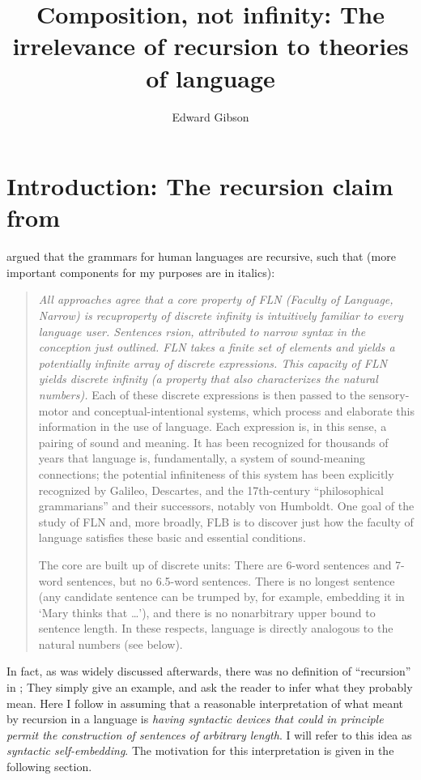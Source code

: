 \documentclass{article}
\title[Composition, not infinity]{Composition, not infinity: The irrelevance of recursion to theories of language}
\author{Edward Gibson\affiliation{Department of Brain and Cognitive Sciences, MIT}}
\begin{document}
\maketitle
\label{chap-2_gibson}


\section{Introduction: The recursion claim from \citet{hauser2002faculty}}

\citet{hauser2002faculty} argued that the grammars for human languages are recursive, such that (more important components for my purposes are in italics):

\begin{quote}
\textit{All approaches agree that a core property of FLN (Faculty of Language, Narrow) is recuproperty of discrete infinity is intuitively familiar to every language user. Sentences rsion, attributed to narrow syntax in the conception just outlined. FLN takes a finite set of elements and yields a potentially infinite array of discrete expressions. This capacity of FLN yields discrete infinity (a property that also characterizes the natural numbers).} Each of these discrete expressions is then passed to the sensory-motor and conceptual-intentional systems, which process and elaborate this information in the use of language. Each expression is, in this sense, a pairing of sound and meaning. It has been recognized for thousands of years that language is, fundamentally, a system of sound-meaning connections; the potential infiniteness of this system has been explicitly recognized by Galileo, Descartes, and the 17th-century ``philosophical grammarians'' and their successors, notably von Humboldt. One goal of the study of FLN and, more broadly, FLB is to discover just how the faculty of language satisfies these basic and essential conditions.

\textit{}{The core are built up of discrete units:  There are 6-word sentences and 7-word sentences, but no 6.5-word sentences.  There is no longest sentence (any candidate sentence can be trumped by, for example, embedding it in `Mary thinks that  \ldots '), and there is no nonarbitrary upper bound to sentence length.  In these respects, language is directly analogous to the natural numbers (see below). } \citep[1571]{hauser2002faculty}
\end{quote}

In fact, as was widely discussed afterwards, there was no definition of ``recursion'' in \citet{hauser2002faculty};  They simply give an example, and ask the reader to infer what they probably mean.  
Here I follow \citet{pullum2020theorizing}  in assuming that a reasonable interpretation of what  \citet{hauser2002faculty} meant by recursion in a language is \textit{having syntactic devices that could in principle permit the construction of sentences of arbitrary length}.  I will refer to  this idea as \textit{syntactic self-embedding}.  The motivation for this interpretation is given in the following section.
\end{document}
